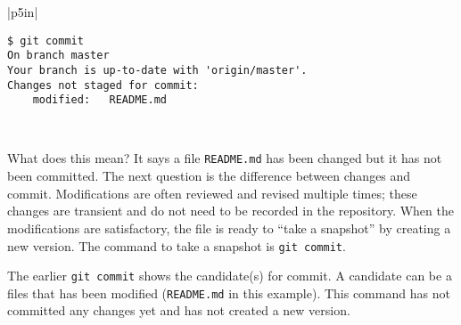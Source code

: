 \vspace{0.2in}

\noindent
\begin{tabular}{|p{5in}|}\hline
\begin{verbatim}
$ git commit
On branch master
Your branch is up-to-date with 'origin/master'.
Changes not staged for commit:
	modified:   README.md
\end{verbatim}
\\ \hline
\end{tabular}
\vspace{0.2in}

What does this mean? It says a file {\tt README.md} has been changed
but it has not been committed. The next question is the difference
between changes and commit.  Modifications are often reviewed and
revised multiple times; these changes are transient and do not need to
be recorded in the repository.  When the modifications are
satisfactory, the file is ready to ``take a snapshot'' by creating a
new version.  The command to take a snapshot is {\tt git commit}.

The earlier {\tt git commit} shows the candidate(s) for commit.  A
candidate can be a files that has been modified ({\tt README.md} in
this example).  This command has not committed any changes yet and has
not created a new version.
